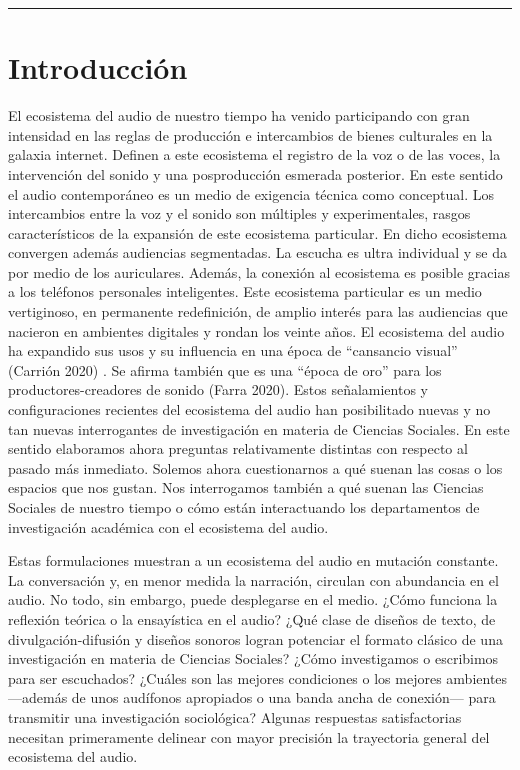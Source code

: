 \documentclass[
]{interact}
\begin{document}
\begin{center}\rule{0.5\linewidth}{0.5pt}\end{center}

\section{Introducción}\label{introducciuxf3n}

El ecosistema del audio de nuestro tiempo ha venido participando con
gran intensidad en las reglas de producción e intercambios de bienes
culturales en la galaxia internet. Definen a este ecosistema el registro
de la voz o de las voces, la intervención del sonido y una posproducción
esmerada posterior. En este sentido el audio contemporáneo es un medio
de exigencia técnica como conceptual. Los intercambios entre la voz y el
sonido son múltiples y experimentales, rasgos característicos de la
expansión de este ecosistema particular. En dicho ecosistema convergen
además audiencias segmentadas. La escucha es ultra individual y se da
por medio de los auriculares. Además, la conexión al ecosistema es
posible gracias a los teléfonos personales inteligentes. Este ecosistema
particular es un medio vertiginoso, en permanente redefinición, de
amplio interés para las audiencias que nacieron en ambientes digitales y
rondan los veinte años. El ecosistema del audio ha expandido sus usos y
su influencia en una época de ``cansancio visual'' (Carrión 2020) . Se
afirma también que es una ``época de oro'' para los
productores-creadores de sonido (Farra 2020). Estos señalamientos y
configuraciones recientes del ecosistema del audio han posibilitado
nuevas y no tan nuevas interrogantes de investigación en materia de
Ciencias Sociales. En este sentido elaboramos ahora preguntas
relativamente distintas con respecto al pasado más inmediato. Solemos
ahora cuestionarnos a qué suenan las cosas o los espacios que nos
gustan. Nos interrogamos también a qué suenan las Ciencias Sociales de
nuestro tiempo o cómo están interactuando los departamentos de
investigación académica con el ecosistema del audio.

Estas formulaciones muestran a un ecosistema del audio en mutación
constante. La conversación y, en menor medida la narración, circulan con
abundancia en el audio. No todo, sin embargo, puede desplegarse en el
medio. ¿Cómo funciona la reflexión teórica o la ensayística en el audio?
¿Qué clase de diseños de texto, de divulgación-difusión y diseños
sonoros logran potenciar el formato clásico de una investigación en
materia de Ciencias Sociales? ¿Cómo investigamos o escribimos para ser
escuchados? ¿Cuáles son las mejores condiciones o los mejores ambientes
---además de unos audífonos apropiados o una banda ancha de conexión---
para transmitir una investigación sociológica? Algunas respuestas
satisfactorias necesitan primeramente delinear con mayor precisión la
trayectoria general del ecosistema del audio.
\end{document}
